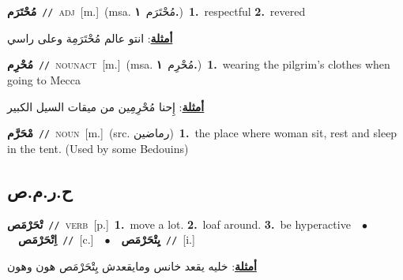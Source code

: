 \documentclass[10pt,a4paper,twoside]{article} %
\begin{document}
\begin{multicols}{2}
{\setlength\topsep{0pt}\textbf{\foreignlanguage{arabic}{مُحْتَرَم}}\ {\color{gray}\texttt{//}\color{black}}\ \textsc{adj}\ [m.]\ \color{gray}(msa. \foreignlanguage{arabic}{مُحْتَرَم}~\foreignlanguage{arabic}{\textbf{١.}})\color{black}\ \textbf{1.}~respectful  \textbf{2.}~revered\  \begin{flushright}\color{gray}\foreignlanguage{arabic}{\textbf{\underline{\foreignlanguage{arabic}{أمثلة}}}: انتو عالم مُحْتَرَمِة وعلى راسي}\end{flushright}\color{black}} \vspace{2mm}

{\setlength\topsep{0pt}\textbf{\foreignlanguage{arabic}{مُحْرِم}}\ {\color{gray}\texttt{//}\color{black}}\ \textsc{noun\textunderscore act}\ [m.]\ \color{gray}(msa. \foreignlanguage{arabic}{مُحْرِم}~\foreignlanguage{arabic}{\textbf{١.}})\color{black}\ \textbf{1.}~wearing the pilgrim's clothes when going to Mecca\  \begin{flushright}\color{gray}\foreignlanguage{arabic}{\textbf{\underline{\foreignlanguage{arabic}{أمثلة}}}: إِحنا مُحْرِمِين من ميقات السيل الكبير}\end{flushright}\color{black}} \vspace{2mm}

{\setlength\topsep{0pt}\textbf{\foreignlanguage{arabic}{مْحَرَّم}}\ {\color{gray}\texttt{//}\color{black}}\ \textsc{noun}\ [m.]\ (src. \color{gray}\foreignlanguage{arabic}{رماضين}\color{black})\ \textbf{1.}~the place where woman sit, rest and sleep in the tent. (Used by some Bedouins)\ } \vspace{2mm}

\vspace{-3mm}
\subsection*{\color{blue}\foreignlanguage{arabic}{ح.ر.م.ص}\color{blue}{}} 

{\setlength\topsep{0pt}\textbf{\foreignlanguage{arabic}{تْحَرْمَص}}\ {\color{gray}\texttt{//}\color{black}}\ \textsc{verb}\ [p.]\ \textbf{1.}~move a lot.  \textbf{2.}~loaf around.  \textbf{3.}~be hyperactive\ \ $\bullet$\ \ \setlength\topsep{0pt}\textbf{\foreignlanguage{arabic}{اِتْحَرْمَص}}\ {\color{gray}\texttt{//}\color{black}}\ [c.]\ \ $\bullet$\ \ \setlength\topsep{0pt}\textbf{\foreignlanguage{arabic}{يِتْحَرْمَص}}\ {\color{gray}\texttt{//}\color{black}}\ [i.]\  \begin{flushright}\color{gray}\foreignlanguage{arabic}{\textbf{\underline{\foreignlanguage{arabic}{أمثلة}}}: خليه يقعد خانس ومايقعدش يِتْحَرْمَص هون وهون}\end{flushright}\color{black}} \vspace{2mm}


\end{multicols}
\end{document}
